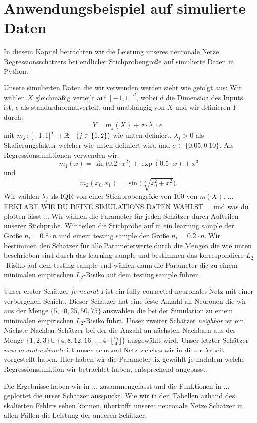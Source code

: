 \chapter{Anwendungsbeispiel auf simulierte Daten}
\label{chap:4}

In diesem Kapitel betrachten wir die Leistung unseres neuronale Netze Regressionsschätzers bei endlicher Stichprobengröße auf simulierte Daten in Python.

Unsere simulierten Daten die wir verwenden werden sieht wie gefolgt aus:
Wir wählen $X$ gleichmäßig verteilt auf $[-1, 1]^d$, wobei $d$ die Dimension des Inputs ist, $\epsilon$ als standardnormalverteilt und unabhängig von $X$ und wir definieren $Y$ durch:
$$Y = m_j(X) + \sigma \cdot \lambda_j \cdot \epsilon,$$ 
mit $m_j \colon [-1, 1]^d \to \mathbb{R} \quad (j \in \{1, 2\})$ wie unten definiert, $\lambda_j > 0$ als Skalierungsfaktor welcher wie unten definiert wird und $\sigma \in \{0.05, 0.10\}.$ Als Regressionsfunktionen verwenden wir:
$$ m_1(x) =  \sin\big(0.2 \cdot x^2\big) + \exp(0.5 \cdot x) + x^3$$
und
$$ m_2(x_0, x_1) = \sin\big(\sqrt[2]{x_0^2 + x_1^2}\big).$$
Wir wählen $\lambda_j$ als IQR von einer Stichprobengröße von 100 von $m(X)$. ... ERKLÄRE WIE DU DEINE SIMULATIONS DATEN WÄHLST ...
und was du plotten lässt ... 
Wir wählen die Parameter für jeden Schätzer durch Aufteilen unserer Stichprobe. Wir teilen die Stichprobe auf in ein learning sample der Größe $n_l = 0.8 \cdot n$ und einem testing sample der Größe $n_t = 0.2 \cdot n$. Wir bestimmen den Schätzer für alle Parameterwerte durch die Mengen die wie unten beschrieben sind durch das learning sample und bestimmen das korrespondiere $L_2$-Risiko auf dem testing sample und wählen dann die Parameter die zu einem minimalen empirischen $L_2$-Risiko auf dem testing sample führen.

Unser erster Schätzer \textit{fc-neural-1} ist ein fully connected neuronales Netz mit einer verborgenen Schicht. Dieser Schätzer hat eine feste Anzahl an Neuronen die wir aus der Menge $\{5, 10, 25, 50, 75\}$ auswählen die bei der Simulation zu einem minimalen empirischen $L_2$-Risiko führt.
Unser zweiter Schätzer \textit{neighbor} ist ein Nächste-Nachbar Schätzer bei der die Anzahl an nächsten Nachbarn aus der Menge $\{1, 2, 3\} \cup \{4, 8, 12, 16, \dots, 4 \cdot \lfloor\frac{n_l}{4}\rfloor\}$ ausgewählt wird.
Unser letzter Schätzer \textit{new-neural-estimate} ist unser neuronal Netz welches wir in dieser Arbeit vorgestellt haben. Hier haben wir die Parameter fix gewählt je nachdem welche Regressionsfunktion wir betrachtet haben, entsprechend angepasst.

Die Ergebnisse haben wir in ... zusammengefasst und die Funktionen in ... geplottet die unser Schätzer ausspuckt. 
Wie wir in den Tabellen anhand des skalierten Fehlers sehen können, übertrifft unserer neuronale Netze Schätzer  in allen Fällen die Leistung der anderen Schätzer. 

